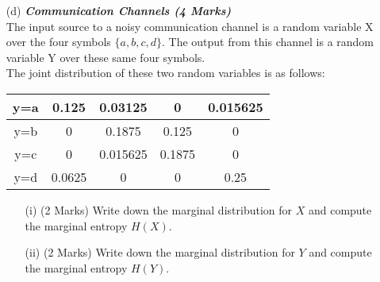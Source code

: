 \documentclass[]{article}
\begin{document}
\begin{itemize}
\item[(d)] \textbf{\textit{Communication Channels (4 Marks)}}\\
The input source to a noisy communication channel is a random variable X over the
four symbols $\{a, b, c, d\}$. The output from this channel is a random variable Y over these same
four symbols. \\
\noindent 
The joint distribution of these two random variables is as follows:\\ 
\begin{center}
\begin{tabular}{|c|c|c|c|c|}
\hline
y=a & 0.125	&	0.03125	&	0	&	0.015625	\\ \hline
y=b & 0	&	0.1875	&	0.125	&	0	\\ \hline
y=c & 0	&	0.015625	&	0.1875	&	0	\\ \hline
y=d & 0.0625	&	0	&	0	&	0.25	\\ \hline
\end{tabular}
\end{center}

\begin{itemize}
\item[(i)] (2 Marks) Write down the marginal distribution for $X$ and compute the marginal entropy $H(X)$.
\item[(ii)] (2 Marks) Write down the marginal distribution for $Y$ and compute the marginal entropy $H(Y )$.
\end{itemize}
\end{itemize}
\end{document}

